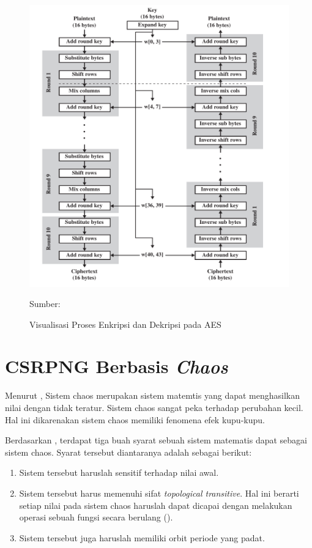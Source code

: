 \begin{figure}[!h]
  \centering
  \includegraphics[width=\textwidth]{chapters/res/chapter-2/img/crypto.aes.png}
  \caption{Visualisasi Proses Enkripsi dan Dekripsi pada AES} \label{fig:crypto.aes}
  Sumber: \textcite{staling2011}
\end{figure}

\section{CSRPNG Berbasis \emph{Chaos}}
Menurut \textcite{munir2019}, Sistem chaos merupakan sistem matemtis yang dapat menghasilkan nilai dengan tidak teratur. Sistem chaos sangat peka terhadap perubahan kecil. Hal ini dikarenakan sistem chaos memiliki fenomena efek kupu-kupu.

Berdasarkan \textcite{boris2003}, terdapat tiga buah syarat sebuah sistem matematis dapat sebagai sistem chaos. Syarat tersebut diantaranya adalah sebagai berikut:
\begin{enumerate}
  \item Sistem tersebut haruslah sensitif terhadap nilai awal.
  \item Sistem tersebut harus memenuhi sifat \emph{topological transitive}. Hal ini berarti setiap nilai pada sistem chaos haruslah dapat dicapai dengan melakukan operasi sebuah fungsi secara berulang (\textcite{boris2003}).
  \item Sistem tersebut juga haruslah memiliki orbit periode yang padat.
\end{enumerate}

